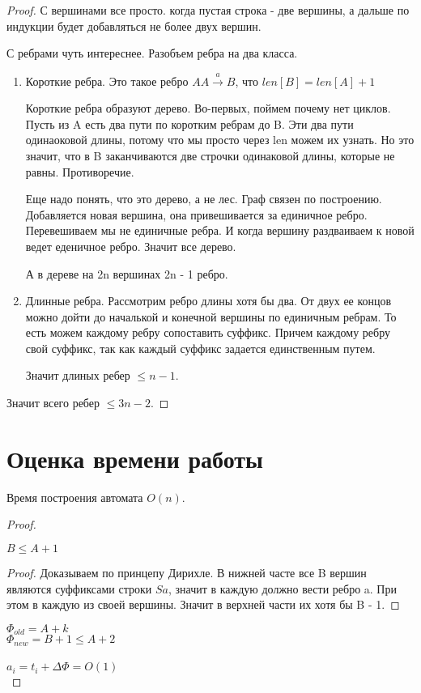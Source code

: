 \begin{proof}
С вершинами все просто. когда пустая строка - две вершины, а дальше по индукции будет добавляться 
не более двух вершин. 

С ребрами чуть интереснее. Разобъем ребра на два класса. 
\begin{enumerate}
    \item Короткие ребра. Это такое ребро $A A \overset{a}{\rightarrow} B$, что $len[B] = len[A] + 1$

    Короткие ребра образуют дерево. Во-первых, поймем почему нет циклов. Пусть из A есть два пути по коротким ребрам 
    до B. Эти два пути одинаоковой длины, потому что мы просто через len можем их узнать. Но это 
    значит, что в B заканчиваются две строчки одинаковой длины, которые не равны. Противоречие.

    Еще надо понять, что это дерево, а не лес. Граф связен по построению. Добавляется новая вершина, 
    она привешивается за единичное ребро. Перевешиваем мы не единичные ребра. И когда вершину раздваиваем к новой 
    ведет еденичное ребро. Значит все дерево. 

    А в дереве на 2n вершинах 2n - 1 ребро. 
    \item Длинные ребра. Рассмотрим ребро длины хотя бы два. От двух ее концов можно 
    дойти до началькой и конечной вершины по единичным ребрам. То есть можем каждому ребру сопоставить 
    суффикс. Причем каждому ребру свой суффикс, так как каждый суффикс задается единственным путем. 

    Значит длиных ребер $\le n - 1$. 
\end{enumerate}
Значит всего ребер $\le 3n - 2$.
\end{proof}
\section{Оценка времени работы}
\begin{theorem}
Время построения автомата $O(n)$.
\end{theorem}
\begin{proof}

\begin{lemma}
$B \le A + 1$
\end{lemma}

\begin{proof}
   Доказываем по принцепу Дирихле. В нижней часте все B вершин 
   являются суффиксами строки $Sa$, значит в каждую должно вести ребро a. 
   При этом в каждую из своей вершины. Значит в верхней части их хотя 
   бы B - 1.
\end{proof}

$\Phi_{old} = A + k$ \\
$\Phi_{new} = B + 1 \le A + 2$\\
\\
$a_i = t_i + \Delta \Phi = O(1)$\\

\end{proof}


